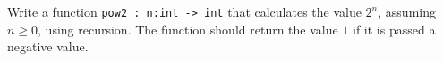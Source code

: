 Write a function \lstinline{pow2 : n:int -> int} that calculates the value $2^n$, assuming $n \geq 0$, using recursion. The function should return the value $1$ if it is passed a negative value.

